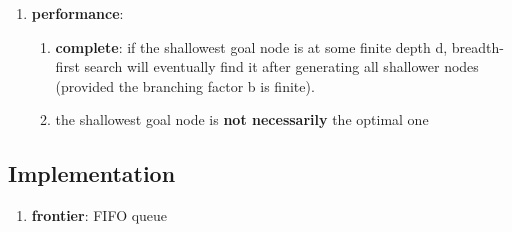 \begin{enumerate}[itemsep=0.2cm]
    \item \textbf{performance}:
    \begin{enumerate}[itemsep=0.2cm]
        \item \textbf{complete}: if the shallowest goal node is at some finite depth d, breadth-first search will eventually find it after generating all shallower nodes (provided the branching factor b is finite). 
        \hfill \cite{ai/book/Artificial-Intelligence-A-Modern-Approach/Russell-Norvig}

        \item  the shallowest goal node is \textbf{not necessarily} the optimal one
        \hfill \cite{ai/book/Artificial-Intelligence-A-Modern-Approach/Russell-Norvig}
    \end{enumerate}
\end{enumerate}


\subsection{Implementation}

\begin{enumerate}
    \item \textbf{frontier}: FIFO queue
\end{enumerate}


\vspace{0.5cm}


